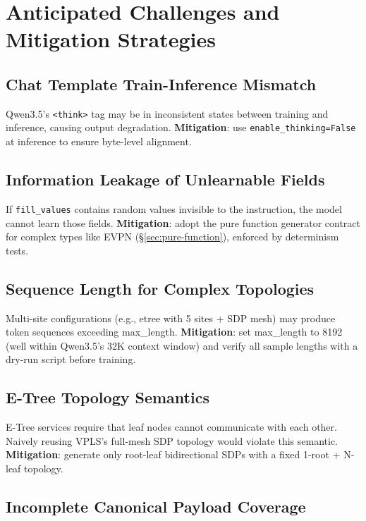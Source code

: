 \documentclass[12pt, a4paper]{article}
\newcommand{\fillvalues}{\texttt{fill\_values}}
\begin{document}
\section{Anticipated Challenges and Mitigation Strategies}
\label{sec:challenges}

\subsection{Chat Template Train-Inference Mismatch}

Qwen3.5's \texttt{<think>} tag may be in inconsistent states between training and inference, causing output degradation. \textbf{Mitigation}: use \texttt{enable\_thinking=False} at inference to ensure byte-level alignment.

\subsection{Information Leakage of Unlearnable Fields}

If \fillvalues{} contains random values invisible to the instruction, the model cannot learn those fields. \textbf{Mitigation}: adopt the pure function generator contract for complex types like EVPN (\S\ref{sec:pure-function}), enforced by determinism tests.

\subsection{Sequence Length for Complex Topologies}

Multi-site configurations (e.g., etree with 5 sites + SDP mesh) may produce token sequences exceeding max\_length. \textbf{Mitigation}: set max\_length to 8192 (well within Qwen3.5's 32K context window) and verify all sample lengths with a dry-run script before training.

\subsection{E-Tree Topology Semantics}

E-Tree services require that leaf nodes cannot communicate with each other. Naively reusing VPLS's full-mesh SDP topology would violate this semantic. \textbf{Mitigation}: generate only root-leaf bidirectional SDPs with a fixed 1-root + N-leaf topology.

\subsection{Incomplete Canonical Payload Coverage}
\end{document}
